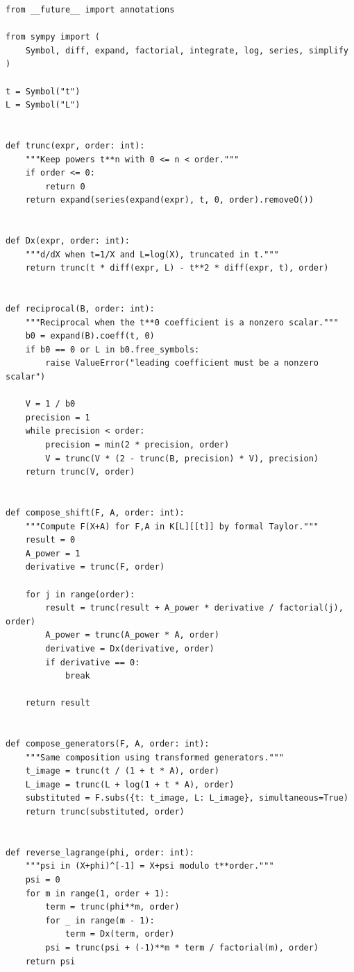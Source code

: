 \documentclass[11pt,oneside,openany]{book}
\begin{document}
\begin{lstlisting}[style=pythonstyle,caption={Reference implementation for the discrete polynomial-logarithmic ring.},label={lst:implementation}]
from __future__ import annotations

from sympy import (
    Symbol, diff, expand, factorial, integrate, log, series, simplify
)

t = Symbol("t")
L = Symbol("L")


def trunc(expr, order: int):
    """Keep powers t**n with 0 <= n < order."""
    if order <= 0:
        return 0
    return expand(series(expand(expr), t, 0, order).removeO())


def Dx(expr, order: int):
    """d/dX when t=1/X and L=log(X), truncated in t."""
    return trunc(t * diff(expr, L) - t**2 * diff(expr, t), order)


def reciprocal(B, order: int):
    """Reciprocal when the t**0 coefficient is a nonzero scalar."""
    b0 = expand(B).coeff(t, 0)
    if b0 == 0 or L in b0.free_symbols:
        raise ValueError("leading coefficient must be a nonzero scalar")

    V = 1 / b0
    precision = 1
    while precision < order:
        precision = min(2 * precision, order)
        V = trunc(V * (2 - trunc(B, precision) * V), precision)
    return trunc(V, order)


def compose_shift(F, A, order: int):
    """Compute F(X+A) for F,A in K[L][[t]] by formal Taylor."""
    result = 0
    A_power = 1
    derivative = trunc(F, order)

    for j in range(order):
        result = trunc(result + A_power * derivative / factorial(j), order)
        A_power = trunc(A_power * A, order)
        derivative = Dx(derivative, order)
        if derivative == 0:
            break

    return result


def compose_generators(F, A, order: int):
    """Same composition using transformed generators."""
    t_image = trunc(t / (1 + t * A), order)
    L_image = trunc(L + log(1 + t * A), order)
    substituted = F.subs({t: t_image, L: L_image}, simultaneous=True)
    return trunc(substituted, order)


def reverse_lagrange(phi, order: int):
    """psi in (X+phi)^[-1] = X+psi modulo t**order."""
    psi = 0
    for m in range(1, order + 1):
        term = trunc(phi**m, order)
        for _ in range(m - 1):
            term = Dx(term, order)
        psi = trunc(psi + (-1)**m * term / factorial(m), order)
    return psi



\end{lstlisting}
\end{document}

